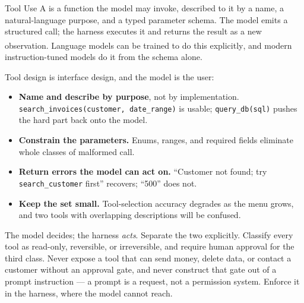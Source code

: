 \begin{v3topic}{Tool Use}
    A  is a function the model may invoke, described to it by a
    name, a natural-language purpose, and a typed parameter schema. The model
    emits a structured call; the harness executes it and returns the result as
    a new observation. Language models can be trained to do this
    explicitly\textsuperscript{\cite{schickToolformerLanguageModels2023}}, and
    modern instruction-tuned models do it from the schema alone.

    Tool design is interface design, and the model is the user:
    \begin{itemize}
      \item \textbf{Name and describe by purpose}, not by implementation.
        \texttt{search\_invoices(customer, date\_range)} is usable;
        \texttt{query\_db(sql)} pushes the hard part back onto the model.
      \item \textbf{Constrain the parameters.} Enums, ranges, and required
        fields eliminate whole classes of malformed call.
      \item \textbf{Return errors the model can act on.} ``Customer not found;
        try \texttt{search\_customer} first'' recovers; ``500'' does not.
      \item \textbf{Keep the set small.} Tool-selection accuracy degrades as
        the menu grows, and two tools with overlapping descriptions will be
        confused.
    \end{itemize}

\begin{cautionbox}
The model decides; the harness \emph{acts}. Separate the two explicitly.
Classify every tool as read-only, reversible, or irreversible, and require
human approval for the third class. Never expose a tool that can send money,
delete data, or contact a customer without an approval gate, and never
construct that gate out of a prompt instruction --- a prompt is a request, not
a permission system. Enforce it in the harness, where the model cannot reach.
\end{cautionbox}
\end{v3topic}

